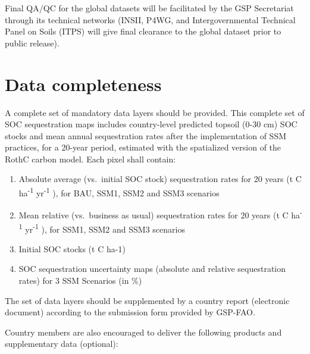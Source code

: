 \documentclass[
  10pt,
  b5paper,
]{book}
\providecommand{\tightlist}{%
  \setlength{\itemsep}{0pt}\setlength{\parskip}{0pt}}
\begin{document}
Final QA/QC for the global datasets will be facilitated by the GSP Secretariat through its technical networks (INSII, P4WG, and Intergovernmental Technical Panel on Soils (ITPS) will give final clearance to the global dataset prior to public release).

\hypertarget{data-completeness}{%
\section{Data completeness}\label{data-completeness}}

A complete set of mandatory data layers should be provided. This complete set of SOC sequestration maps includes country-level predicted topsoil (0-30 cm) SOC stocks and mean annual sequestration rates after the implementation of SSM practices, for a 20-year period, estimated with the spatialized version of the RothC carbon model. Each pixel shall contain:

\begin{enumerate}
\def\labelenumi{\arabic{enumi}.}
\tightlist
\item
  Absolute average (vs.~initial SOC stock) sequestration rates for 20 years (t C ha\textsuperscript{-1} yr\textsuperscript{-1} ), for BAU, SSM1, SSM2 and SSM3 scenarios
\item
  Mean relative (vs.~business as usual) sequestration rates for 20 years (t C ha\textsuperscript{-1} yr\textsuperscript{-1} ), for SSM1, SSM2 and SSM3 scenarios
\item
  Initial SOC stocks (t C ha-1)
\item
  SOC sequestration uncertainty maps (absolute and relative sequestration rates) for 3 SSM Scenarios (in \%)
\end{enumerate}

The set of data layers should be supplemented by a country report (electronic document) according to the submission form provided by GSP-FAO.

Country members are also encouraged to deliver the following products and supplementary data (optional):
\end{document}
